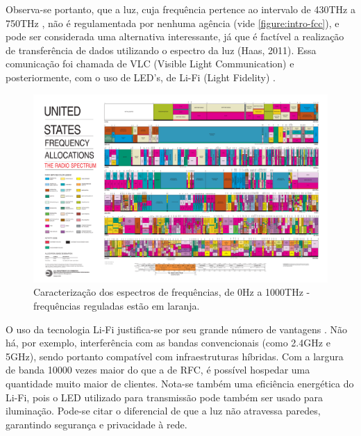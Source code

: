 	Observa-se portanto, que a luz, cuja frequência pertence ao intervalo de 430THz a 750THz \cite{vision},  não é regulamentada por nenhuma agência (vide \autoref{figure:intro-fcc}), e pode ser considerada uma alternativa interessante, já que é factível a realização de transferência de dados utilizando o espectro da luz (Haas, 2011). Essa comunicação foi chamada de VLC (Visible Light Communication) e posteriormente, com o uso de LED's, de Li-Fi (Light Fidelity) \cite{what-is-lifi}. \par

	\begin{figure}[h!]
	 	\caption{\label{figure:intro-fcc}Caracterização dos espectros de frequências, de 0Hz a 1000THz - frequências reguladas estão em laranja.}
		\centering
 		\includegraphics[width=\textwidth, trim={36.5cm 3.1cm 40cm 61cm},clip]{2003-allochrt.pdf}
	\end{figure}

	O uso da tecnologia Li-Fi justifica-se por seu grande número de vantagens \cite{comparison-wifi}. Não há, por exemplo, interferência com as bandas convencionais (como 2.4GHz e 5GHz), sendo portanto compatível com infraestruturas híbridas. Com a largura de banda 10000 vezes maior do que a de RFC, é possível hospedar uma quantidade muito maior de clientes. Nota-se também uma eficiência energética do Li-Fi, pois o LED utilizado para transmissão pode também ser usado para iluminação. Pode-se citar o diferencial de que a luz não atravessa paredes, garantindo segurança e privacidade à rede. \par

